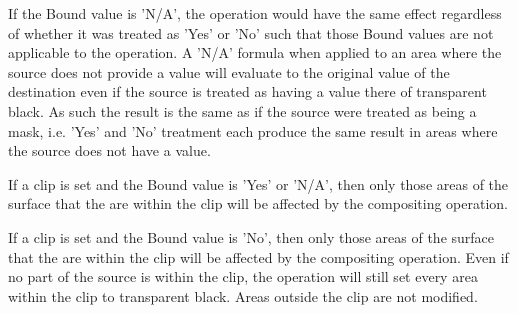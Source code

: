 \pnum
If the Bound value is 'N/A', the operation would have the same effect 
regardless of whether it was treated as 'Yes' or 'No' such that those 
Bound values are not applicable to the operation. A 'N/A' formula when 
applied to an area where the source does not provide a value will evaluate to 
the original value of the destination even if the source is treated as having a 
value there of transparent black. As such the result is the same as if the 
source were treated as being a mask, i.e. 'Yes' and 'No' treatment each 
produce the same result in areas where the source does not have a value.

\pnum
If a clip is set and the Bound value is 'Yes' or 'N/A', then only those
areas of the surface that the are within the clip will be affected by the
compositing operation.

\pnum
If a clip is set and the Bound value is 'No', then only those areas of
the surface that the are within the clip will be affected by the compositing
operation. Even if no part of the source is within the clip, the operation will
still set every area within the clip to transparent black. Areas outside the
clip are not modified.

